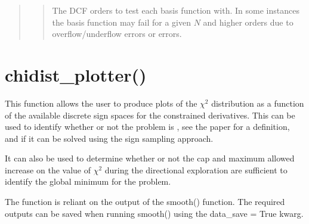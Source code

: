 \documentclass[letterpaper,10pt,english]{sphinxmanual}
\begin{document}
\begin{fulllineitems}
\begin{quote}
\begin{description}
\end{description}

\begin{quote}

\begin{DUlineblock}{0em}
\item[] The DCF orders to test each basis function with. In
some instances the basis function may fail for a given
\({N}\) and higher orders due to overflow/underflow
errors or  errors.
\end{DUlineblock}
\end{quote}
\end{quote}

\end{fulllineitems}



\section{chidist\_plotter()}
\label{\detokenize{source/maxsmooth:module-maxsmooth.chidist_plotter}}\label{\detokenize{source/maxsmooth:chidist-plotter}}
This function allows the user to produce plots of the \({\chi^2}\)
distribution as a function of the available discrete sign spaces for the
constrained derivatives. This can be used to identify whether or not the
problem is , see the  paper for a definition,
and if it can be solved using the sign sampling approach.

It can also be used to determine whether or not the \textquotesingle{}cap\textquotesingle{} and maximum allowed
increase on the value of \({\chi^2}\) during the directional exploration
are sufficient to identify the global minimum for the problem.

The function is reliant on the output of the  smooth() function.
The required outputs can be saved when running smooth()
using the \textquotesingle{}data\_save = True\textquotesingle{} kwarg.
\end{document}
